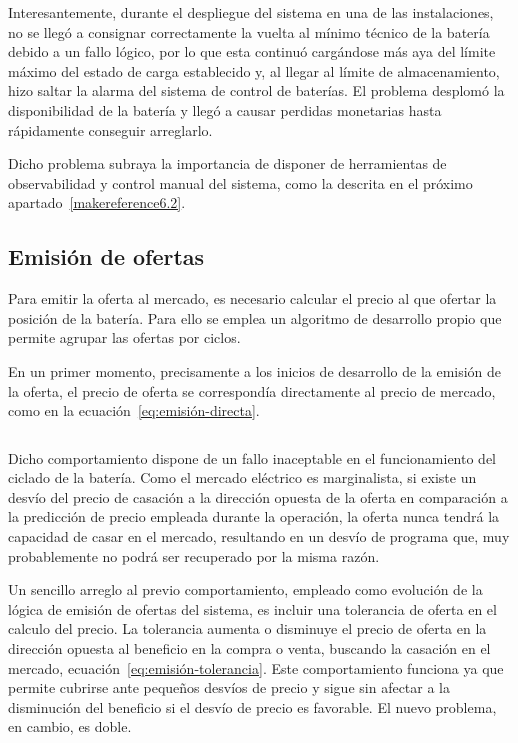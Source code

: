 Interesantemente, durante el despliegue del sistema en una de las instalaciones, no se llegó a consignar correctamente la vuelta al mínimo técnico de la batería debido a un fallo lógico, por lo que esta continuó cargándose más aya del límite máximo del estado de carga establecido y, al llegar al límite de almacenamiento, hizo saltar la alarma del sistema de control de baterías. El problema desplomó la disponibilidad de la batería y llegó a causar perdidas monetarias hasta rápidamente conseguir arreglarlo.

Dicho problema subraya la importancia de disponer de herramientas de observabilidad y control manual del sistema, como la descrita en el próximo apartado~\ref{makereference6.2}.

\subsection{Emisión de ofertas}
\label{makereference6.1.2}

Para emitir la oferta al mercado, es necesario calcular el precio al que ofertar la posición de la batería. Para ello se emplea un algoritmo de desarrollo propio que permite agrupar las ofertas por ciclos.

En un primer momento, precisamente a los inicios de desarrollo de la emisión de la oferta, el precio de oferta se correspondía directamente al precio de mercado, como en la ecuación~\ref{eq:emisión-directa}.

\begin{equation}
\label{eq:emisión-directa}
\end{equation}

Dicho comportamiento dispone de un fallo inaceptable en el funcionamiento del ciclado de la batería. Como el mercado eléctrico es marginalista, si existe un desvío del precio de casación a la dirección opuesta de la oferta en comparación a la predicción de precio empleada durante la operación, la oferta nunca tendrá la capacidad de casar en el mercado, resultando en un desvío de programa que, muy probablemente no podrá ser recuperado por la misma razón.

Un sencillo arreglo al previo comportamiento, empleado como evolución de la lógica de emisión de ofertas del sistema, es incluir una tolerancia de oferta en el calculo del precio. La tolerancia aumenta o disminuye el precio de oferta en la dirección opuesta al beneficio en la compra o venta, buscando la casación en el mercado, ecuación~\ref{eq:emisión-tolerancia}. Este comportamiento funciona ya que permite cubrirse ante pequeños desvíos de precio y sigue sin afectar a la disminución del beneficio si el desvío de precio es favorable. El nuevo problema, en cambio, es doble.

